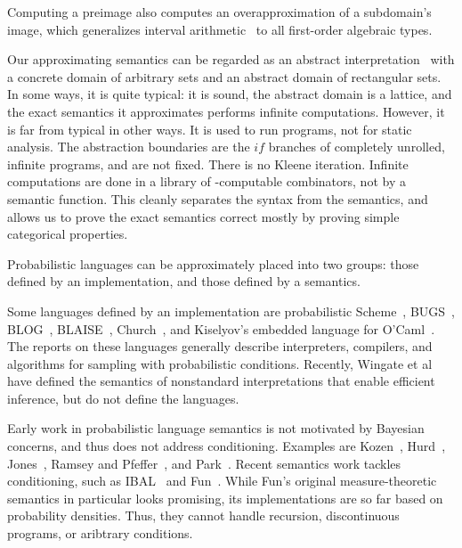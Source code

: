 \documentclass{llncs}
\begin{document}
Computing a preimage also computes an overapproximation of a subdomain's image, which generalizes interval arithmetic~\cite{cit:kearfott-1996eb-interval} to all first-order algebraic types.

Our approximating semantics can be regarded as an abstract interpretation~\cite{cit:cousot-1977popl-abstract-interpretation} with a concrete domain of arbitrary sets and an abstract domain of rectangular sets.
In some ways, it is quite typical: it is sound, the abstract domain is a lattice, and the exact semantics it approximates performs infinite computations.
However, it is far from typical in other ways.
It is used to run programs, not for static analysis.
The abstraction boundaries are the $if$ branches of completely unrolled, infinite programs, and are not fixed.
There is no Kleene iteration.
Infinite computations are done in a library of \lzfclang-computable combinators, not by a semantic function.
This cleanly separates the syntax from the semantics, and allows us to prove the exact semantics correct mostly by proving simple categorical properties.

Probabilistic languages can be approximately placed into two groups: those defined by an implementation, and those defined by a semantics.

Some languages defined by an implementation are probabilistic Scheme~\cite{cit:koller-1997aaai-bayes-programs-short}, BUGS~\cite{cit:winbugs-language-short}, BLOG~\cite{cit:blog-language-short}, BLAISE~\cite{cit:blaise-language}, Church~\cite{cit:church-language-short}, and Kiselyov's embedded language for O'Caml~\cite{cit:kiselyov-2008uai-monolingual}.
The reports on these languages generally describe interpreters, compilers, and algorithms for sampling with probabilistic conditions.
Recently, Wingate et al~\cite{cit:wingate-2011nips-nonstandard} have defined the semantics of nonstandard interpretations that enable efficient inference, but do not define the languages.

Early work in probabilistic language semantics is not motivated by Bayesian concerns, and thus does not address conditioning.
Examples are Kozen~\cite{cit:kozen-1979fcs-prob-programs-short}, Hurd~\cite{cit:hurd-2002thesis}, Jones~\cite{cit:jones-1990thesis}, Ramsey and Pfeffer~\cite{cit:ramsey-2002popl-stochastic-short}, and Park~\cite{cit:park-2008toplas-prob}.
Recent semantics work tackles conditioning, such as IBAL~\cite{cit:pfeffer-2007chapter-ibal} and Fun~\cite{cit:borgstrom-2011esop-measure-transformer}.
While Fun's original measure-theoretic semantics in particular looks promising, its implementations are so far based on probability densities.
Thus, they cannot handle recursion, discontinuous programs, or aribtrary conditions.
\end{document}
